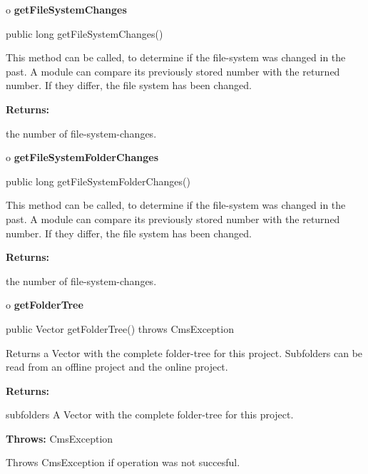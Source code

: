 o {\bf getFileSystemChanges} 

\begin{PRE}
 public long getFileSystemChanges()
\end{PRE}

\begin{description}
\htmlDD This method can be called, to determine if the file-system was changed
in the past. \htmlBR
A module can compare its previously stored number with the returned number. If
they differ, the file system has been changed. 

\begin{description}
\item {\bf Returns:}  

the number of file-system-changes.  
\end{description}

\end{description}

o {\bf getFileSystemFolderChanges} 

\begin{PRE}
 public long getFileSystemFolderChanges()
\end{PRE}

\begin{description}
\htmlDD This method can be called, to determine if the file-system was changed
in the past. \htmlBR
A module can compare its previously stored number with the returned number. If
they differ, the file system has been changed. 

\begin{description}
\item {\bf Returns:}  

the number of file-system-changes.  
\end{description}

\end{description}

o {\bf getFolderTree} 

\begin{PRE}
 public Vector getFolderTree() throws CmsException
\end{PRE}

\begin{description}
\htmlDD Returns a Vector with the complete folder-tree for this
project.\htmlBR
Subfolders can be read from an offline project and the online project. \htmlBR

\begin{description}
\item {\bf Returns:}  

subfolders A Vector with the complete folder-tree for this project.  
\item {\bf Throws:} CmsException  

Throws CmsException if operation was not succesful.  
\end{description}

\end{description}

